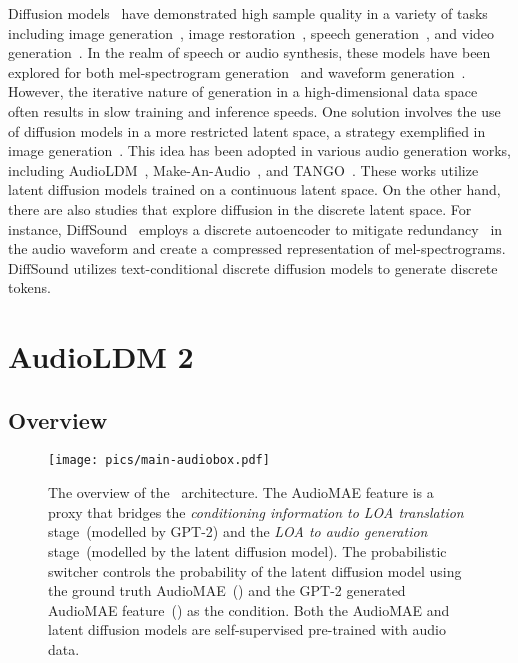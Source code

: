 \documentclass[lettersize,journal]{IEEEtran}
\begin{document}
\noindent
Diffusion models~\cite{DDPM, SGM} have demonstrated high sample quality in a variety of tasks including image generation~\cite{DiffusionBeatsGANs, DALLE2, Imagen}, image restoration~\cite{ISRIR}, speech generation~\cite{WaveGrad, DiffWave, leng2022binauralgrad}, and video generation~\cite{MakeAVideo, ImagenVideo}. In the realm of speech or audio synthesis, these models have been explored for both mel-spectrogram generation~\cite{popov2021gradtts, ResGrad} and waveform generation~\cite{BDDM, PriorGrad, InferGrad}. However, the iterative nature of generation in a high-dimensional data space often results in slow training and inference speeds. One solution involves the use of diffusion models in a more restricted latent space, a strategy exemplified in image generation~\cite{rombach2022high-stablediffusion}. 
This idea has been adopted in various audio generation works, including AudioLDM~\cite{liu2023audioldm}, Make-An-Audio~\cite{huang2023make-an-audio}, and TANGO~\cite{ghosal2023text-tango}. These works utilize latent diffusion models trained on a continuous latent space. On the other hand, there are also studies that explore diffusion in the discrete latent space. For instance, DiffSound~\cite{yang2022diffsound} employs a discrete autoencoder to mitigate redundancy~\cite{liu2023simple, liu2022learning} in the audio waveform and create a compressed representation of mel-spectrograms. DiffSound utilizes text-conditional discrete diffusion models to generate discrete tokens.

\section{AudioLDM 2} 
\label{sec: audiobox}



\subsection{Overview}
\label{sec: overview}
\begin{figure*}[t]
  \centering
  \texttt{[image: pics/main-audiobox.pdf]}
  \caption{The overview of the \vModelName~architecture. The AudioMAE feature is a proxy that bridges the \textit{conditioning information to LOA translation} stage~(modelled by GPT-2) and the \textit{LOA to audio generation} stage~(modelled by the latent diffusion model). The probabilistic switcher controls the probability of the latent diffusion model using the ground truth AudioMAE~() and the GPT-2 generated AudioMAE feature~() as the condition. Both the AudioMAE and latent diffusion models are self-supervised pre-trained with audio data.}
  \label{fig:main-audiobox}
\end{figure*}
\end{document}
